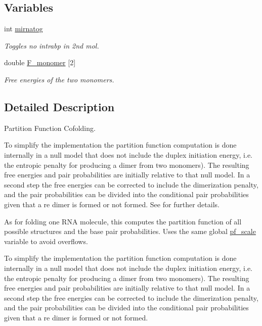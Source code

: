 \subsection*{Variables}
\begin{DoxyCompactItemize}
\item 
\mbox{\label{group__pf__cofold_gaff27888c4088cc1f60fd59cbd589474c}} 
int \hyperlink{group__pf__cofold_gaff27888c4088cc1f60fd59cbd589474c}{mirnatog}
\begin{DoxyCompactList}\small\item\em Toggles no intrabp in 2nd mol. \end{DoxyCompactList}\item 
\mbox{\label{group__pf__cofold_gac2d1851a710a8561390861155ca988fe}} 
double \hyperlink{group__pf__cofold_gac2d1851a710a8561390861155ca988fe}{F\+\_\+monomer} \mbox{[}2\mbox{]}
\begin{DoxyCompactList}\small\item\em Free energies of the two monomers. \end{DoxyCompactList}\end{DoxyCompactItemize}


\subsection{Detailed Description}
Partition Function Cofolding. 

To simplify the implementation the partition function computation is done internally in a null model that does not include the duplex initiation energy, i.\+e. the entropic penalty for producing a dimer from two monomers). The resulting free energies and pair probabilities are initially relative to that null model. In a second step the free energies can be corrected to include the dimerization penalty, and the pair probabilities can be divided into the conditional pair probabilities given that a re dimer is formed or not formed. See \cite{bernhart:2006} for further details.

As for folding one R\+NA molecule, this computes the partition function of all possible structures and the base pair probabilities. Uses the same global \hyperlink{group__model__details_gad3b22044065acc6dee0af68931b52cfd}{pf\+\_\+scale} variable to avoid overflows.

To simplify the implementation the partition function computation is done internally in a null model that does not include the duplex initiation energy, i.\+e. the entropic penalty for producing a dimer from two monomers). The resulting free energies and pair probabilities are initially relative to that null model. In a second step the free energies can be corrected to include the dimerization penalty, and the pair probabilities can be divided into the conditional pair probabilities given that a re dimer is formed or not formed.


